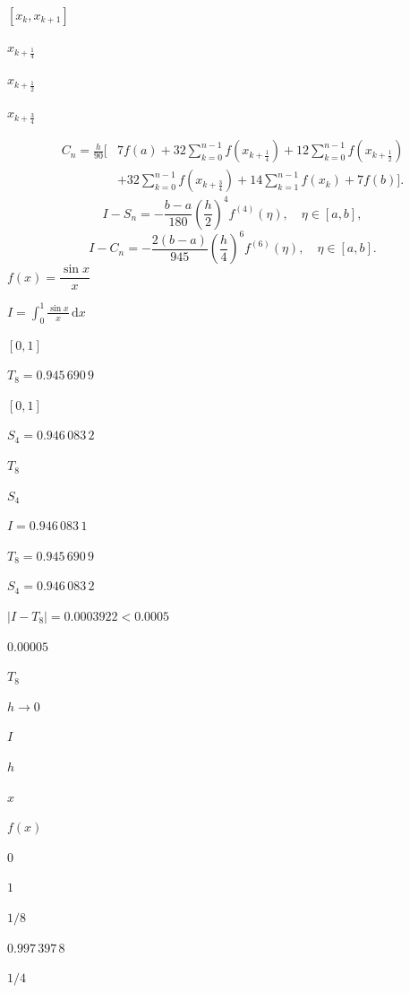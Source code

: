 \documentclass[UTF8,fontset=fandol]{ctexart}
\begin{document}
$[x_k,x_{k+1}]$\par
$x_{k+\frac14}$\par
$x_{k+\frac12}$\par
$x_{k+\frac34}$\par
\[ 
\begin{aligned}
C_n=\frac h{90}\biggl[&7f(a)+32\sum_{k=0}^{n-1}f(x_{k+\frac14})+12\sum_{k=0}^{n-1}f(x_{k+\frac12})\\
&+32\sum_{k=0}^{n-1}f(x_{k+\frac34})+14\sum_{k=1}^{n-1}f(x_k)+7f(b)\biggr].
\end{aligned}
\tag{4.2.12}
 \]
\[ 
I-S_n=-\frac{b-a}{180}\left(\frac h2\right)^4f^{(4)}(\eta),\quad\eta\in[a,b],
\tag{4.2.13}
 \]
\[ 
I-C_n=-\frac{2(b-a)}{945}\left(\frac h4\right)^6f^{(6)}(\eta),\quad\eta\in[a,b].
\tag{4.2.14}
 \]
$f(x)=\dfrac{\sin x}{x}$\par
$I=\displaystyle\int_0^1\frac{\sin x}{x}\,\mathrm{d}x$\par
$[0,1]$\par
$T_8=0.945\,690\,9$\par
$[0,1]$\par
$S_4=0.946\,083\,2$\par
$T_8$\par
$S_4$\par
$I=0.946\,083\,1$\par
$T_8=0.945\,690\,9$\par
$S_4=0.946\,083\,2$\par
$|I-T_8|=0.0003922<0.0005$\par
$0.00005$\par
$T_8$\par
$h\to0$\par
$I$\par
$h$\par
$x$\par
$f(x)$\par
$0$\par
$1$\par
$1/8$\par
$0.997\,397\,8$\par
$1/4$\par
\end{document}
